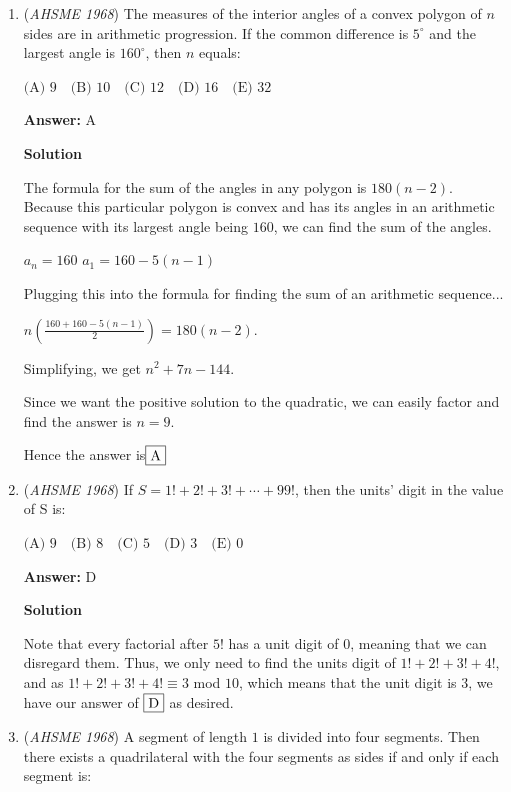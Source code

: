 \begin{enumerate}
 


	\item (\textit{AHSME 1968}) The measures of the interior angles of a convex polygon of $n$ sides are in arithmetic progression. If the common difference is $5^{\circ}$ and the largest angle is $160^{\circ}$, then $n$ equals:


 $\text{(A) } 9\quad \text{(B) } 10\quad \text{(C) } 12\quad \text{(D) } 16\quad \text{(E) } 32$

 \textbf{Answer: }A



\textbf{Solution}

The formula for the sum of the angles in any polygon is $180(n-2)$. Because this particular polygon is convex and has its angles in an arithmetic sequence with its largest angle being $160$, we can find the sum of the angles.

 $a_{n}=160$
$a_{1}=160-5(n-1)$

 Plugging this into the formula for finding the sum of an arithmetic sequence...

 $n\left(\frac{160+160-5(n-1)}{2}\right)=180(n-2)$.

 Simplifying, we get $n^2+7n-144$.

 Since we want the positive solution to the quadratic, we can easily factor and find the answer is $n=\boxed{9}$.

 Hence the answer is$\fbox{A}$



	\item (\textit{AHSME 1968}) If $S=1!+2!+3!+\cdots +99!$, then the units' digit in the value of S is:


 $\text{(A) } 9\quad \text{(B) } 8\quad \text{(C) } 5\quad \text{(D) } 3\quad \text{(E) } 0$

 \textbf{Answer: }D



\textbf{Solution}

Note that every factorial after $5!$ has a unit digit of $0$, meaning that we can disregard them. Thus, we only need to find the units digit of $1! + 2! + 3! +  4!$, and as $1! + 2! + 3! +  4! \equiv 3$ mod $10$, which means that the unit digit is $3$, we have our answer of $\fbox{D}$ as desired.

 


	\item (\textit{AHSME 1968}) A segment of length $1$ is divided into four segments. Then there exists a quadrilateral with the four segments as sides if and only if each segment is:



\end{enumerate}
